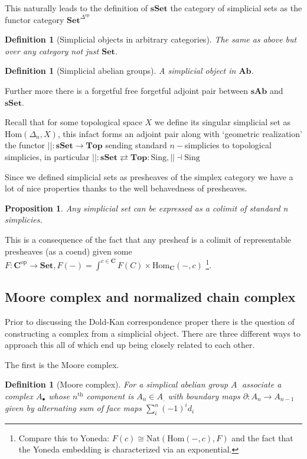 \documentclass[12pt]{report}
\numberwithin{equation}{section}
\newcommand{\Hom}{{\mathrm{Hom}}}
\newtheorem{definition}[dummy]{Definition}
\newtheorem{proposition}[dummy]{Proposition}
\begin{document}
	This naturally leads to the definition of $\mathbf{sSet}$ the category of simplicial sets as the functor category $\mathbf{Set}^{\Delta^\mathrm{op}}$
	\begin{definition}[Simplicial objects in arbitrary categories]
		The same as above but over any category not just $\mathbf{Set}$.
	\end{definition}
	
	\begin{definition}[Simplicial abelian groups]
		A simplicial object in $\mathbf{Ab}$.
	\end{definition}
	Further more there is a forgetful free forgetful adjoint pair between $\mathbf{sAb}$ and $\mathbf{sSet}$.
	
	Recall that for some topological space $X$ we define its singular simplicial set as $\Hom(\Delta_n,X)$, this infact forms an adjoint pair along with `geometric realization' the functor  $||: \mathbf{sSet} \to \mathbf{Top}$ sending standard $n-$simplicies to topological simplicies, in particular $||:\mathbf{sSet} \rightleftarrows \mathbf{Top}: \mathrm{Sing}, || \dashv \mathrm{Sing}$
	
	Since we defined simplicial sets as presheaves of the simplex category we have a lot of nice properties thanks to the well behavedness of presheaves.
	
	\begin{proposition}
		Any simplicial set can be expressed as a colimit of standard n simplicies.
	\end{proposition}
	This is a consequence of the fact that any presheaf is a colimit of representable presheaves (as a coend) given some $F: \mathbf{C}^\mathrm{op} \to \mathbf{Set}, F(-)= \int^{c \in \mathbf{C}} F(C) \times \mathrm{Hom}_\mathbf{C}(-,c)$ \footnote{Compare this to Yoneda: $F(c)\cong \mathrm{Nat}(\Hom(-,c),F)$ and the fact that the Yoneda embedding is characterized via an exponential.}. 
	
	\subsection{Moore complex and normalized chain complex}
	
	Prior to discussing the Dold-Kan correspondence proper there is the question of constructing a complex from a simplicial object. There are three different ways to approach this all of which end up being closely related to each other.
	
	The first is the Moore complex.
	\begin{definition}[Moore complex]
		For a simplical abelian group $A_.$ associate a complex $A_\bullet$ whose $n^\mathrm{th}$ component is $A_n \in A_.$ with boundary maps $\partial:A_n \to A_{n-1}$ given by alternating sum of face maps $\sum_i^n (-1)^i d_i$
	\end{definition}
	
\end{document}
